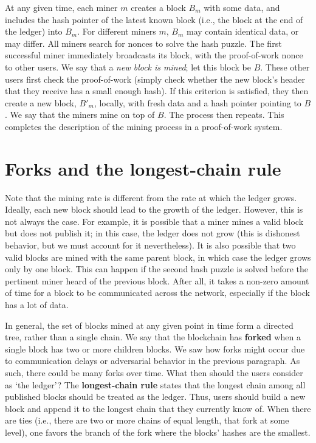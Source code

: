 \documentclass{article}
\begin{document}
At any given time, each miner $m$ creates a block $B_m$ with some data, and includes the hash pointer of the latest known block (i.e., the block at the end of the ledger) into $B_m$. For different miners $m$, $B_m$ may contain identical data, or may differ. All miners search for nonces to solve the hash puzzle. The first successful miner immediately broadcasts its block, with the proof-of-work nonce to other users. We say that a \textit{new block is mined}; let this block be $B$. These other users first check the proof-of-work (simply check whether the new block's header that they receive has a small enough hash). If this criterion is satisfied, they then create a new block, $B'_m$, locally, with fresh data and a hash pointer pointing to $B$. We say that the miners mine on top of $B$. The process then repeats. This completes the description of the mining process in a proof-of-work system.

\section*{Forks and the longest-chain rule}
Note that the mining rate is different from the rate at which the ledger grows. Ideally, each new block should lead to the growth of the ledger. However, this is not always the case. For example, it is possible that a miner mines a valid block but does not publish it; in this case, the ledger does not grow (this is dishonest behavior, but we must account for it nevertheless). It is also possible that two valid blocks are mined with the same parent block, in which case the ledger grows only by one block. This can happen if the second hash puzzle is solved before the pertinent miner heard of the previous block. After all, it takes a non-zero amount of time for a block to be communicated across the network, especially if the block has a lot of data.

In general, the set of blocks mined at any given point in time form a directed tree, rather than a single chain. We say that the blockchain has \textbf{forked} when a single block has two or more children blocks. We saw how forks might occur due to communication delays or adversarial behavior in the previous paragraph. As such, there could be many forks over time. What then should the users consider as `the ledger'? The \textbf{longest-chain rule} states that the longest chain among all published blocks should be treated as the ledger. Thus, users should build a new block and append it to the longest chain that they currently know of. When there are ties (i.e., there are two or more chains of equal length, that fork at some level), one favors the branch of the fork where the blocks' hashes are the smallest.
\end{document}
